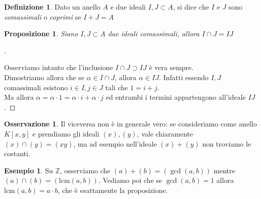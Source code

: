 \documentclass[a4paper,10pt]{article}
\theoremstyle{plain}
\newtheorem{prop}[thm]{Proposizione}
\theoremstyle{definition}
\newtheorem{defn}{Definizione}[section]
\newtheorem*{exmp}{Esempio}
\newtheorem*{oss}{Osservazione}
\newenvironment{myproof}[1][\proofname]{%
  \begin{proof}[#1]$ $\par\nobreak\ignorespaces
}{%
  \qedhere
  \end{proof}
}
\newcommand{\lcm}{\text{lcm}}
\newcommand{\Z}{\mathbb{Z}}
\begin{document}
\begin{defn}
    Dato un anello $A$ e due ideali $I,J\subset A$, si dice che $I$ e $J$ sono \textit{comassimali} o \textit{coprimi} se $I+J=A$
\end{defn}
\begin{prop}
    Siano $I,J\subset A$ due ideali comassimali, allora $I\cap J = IJ$
\end{prop}
\begin{myproof}
    Osserviamo intanto che l'inclusione $I\cap J\supset IJ$ è vera sempre.\\
    Dimostriamo allora che se $\alpha\in I\cap J$, allora $\alpha\in IJ$. Infatti essendo $I,J$ comassimali esistono $i\in I,j\in J$ tali che $1=i+j$.\\
    Ma allora $\alpha=\alpha\cdot1=\alpha\cdot i+\alpha\cdot j$ ed entrambi i termini appartengono all'ideale $IJ$.
\end{myproof}
\begin{oss}
    Il viceversa non è in generale vero: se consideriamo come anello $K[x,y]$ e prendiamo gli ideali $(x),(y)$, vale chiaramente $(x)\cap(y)=(xy)$, ma ad esempio nell'ideale $(x)+(y)$ non troviamo le costanti.
\end{oss}
\begin{exmp}
    Su $\Z$, osserviamo che $(a)+(b)=(\gcd(a,b))$ mentre $(a)\cap(b)=(\lcm(a,b))$. Vediamo poi che se $\gcd(a,b)=1$ allora $\lcm(a,b)=a\cdot b$, che è esattamente la proposizione.
\end{exmp}
\end{document}
